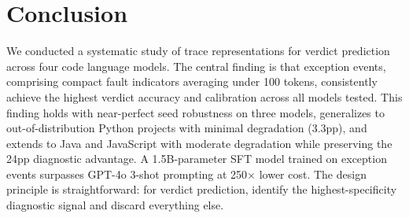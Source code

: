 \documentclass[11pt,a4paper]{article}
\begin{document}
\section{Conclusion}

We conducted a systematic study of trace representations for verdict prediction across four code language models. The central finding is that exception events, comprising compact fault indicators averaging under 100 tokens, consistently achieve the highest verdict accuracy and calibration across all models tested. This finding holds with near-perfect seed robustness on three models, generalizes to out-of-distribution Python projects with minimal degradation (3.3pp), and extends to Java and JavaScript with moderate degradation while preserving the 24pp diagnostic advantage. A 1.5B-parameter SFT model trained on exception events surpasses GPT-4o 3-shot prompting at 250$\times$ lower cost. The design principle is straightforward: for verdict prediction, identify the highest-specificity diagnostic signal and discard everything else.
\end{document}
